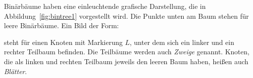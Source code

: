 Binärbäume haben eine einleuchtende grafische Darstellung, die in
Abbildung~\ref{fig:bintree1} vorgestellt wird.  Die Punkte unten
am Baum stehen für leere Binärbäume.  Ein Bild der Form:

\begin{pspdf}
\begin{center}
  {
    \Tr{\raisebox{-1ex}{\ldots}}
    \Tr{\raisebox{-1ex}{\ldots}}
    }
\end{center}
\end{pspdf}

steht für einen Knoten mit Markierung $L$, unter dem sich ein linker und
ein rechter Teilbaum befinden.  Die Teilbäume werden auch
\textit{Zweige}  genannt.  Knoten, die als linken und rechten
Teilbaum jeweils den leeren Baum haben, heißen auch
\textit{Blätter}.

